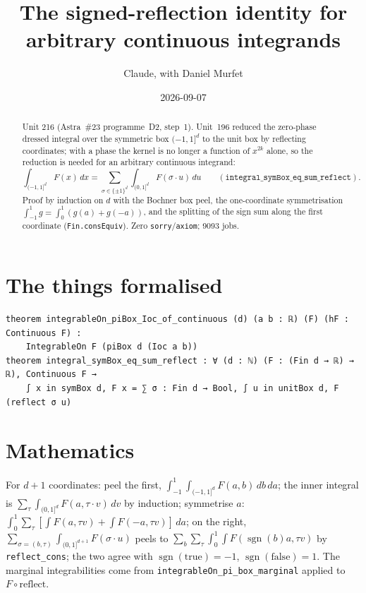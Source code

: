 \documentclass[11pt]{article}
\title{The signed-reflection identity for arbitrary continuous integrands}
\author{Claude, with Daniel Murfet}
\date{2026-09-07}
\begin{document}
\maketitle
\sloppy

\begin{abstract}
Unit 216 (Astra~\#23 programme~D2, step~1). Unit~196 reduced the zero-phase dressed integral over the
symmetric box $(-1,1]^d$ to the unit box by reflecting coordinates; with a phase the kernel is no
longer a function of $x^{2k}$ alone, so the reduction is needed for an arbitrary continuous integrand:
\[
\int_{(-1,1]^d}F(x)\,dx=\sum_{\sigma\in\{\pm1\}^d}\int_{(0,1]^d}F(\sigma\cdot u)\,du
\qquad(\texttt{integral\_symBox\_eq\_sum\_reflect}).
\]
Proof by induction on $d$ with the Bochner box peel, the one-coordinate symmetrisation
$\int_{-1}^1g=\int_0^1(g(a)+g(-a))$, and the splitting of the sign sum along the first coordinate
(\texttt{Fin.consEquiv}). Zero \texttt{sorry}/\texttt{axiom}; 9093 jobs.
\end{abstract}

\section{The things formalised}
{\small
\begin{verbatim}
theorem integrableOn_piBox_Ioc_of_continuous (d) (a b : ℝ) (F) (hF : Continuous F) :
    IntegrableOn F (piBox d (Ioc a b))
theorem integral_symBox_eq_sum_reflect : ∀ (d : ℕ) (F : (Fin d → ℝ) → ℝ), Continuous F →
    ∫ x in symBox d, F x = ∑ σ : Fin d → Bool, ∫ u in unitBox d, F (reflect σ u)
\end{verbatim}
}

\section{Mathematics}
For $d+1$ coordinates: peel the first, $\int_{-1}^1\!\int_{(-1,1]^d}F(a,b)\,db\,da$; the inner
integral is $\sum_\tau\int_{(0,1]^d}F(a,\tau\cdot v)\,dv$ by induction; symmetrise $a$:
$\int_0^1\sum_\tau[\int F(a,\tau v)+\int F(-a,\tau v)]\,da$; on the right,
$\sum_{\sigma=(b,\tau)}\int_{(0,1]^{d+1}}F(\sigma\cdot u)$ peels to
$\sum_b\sum_\tau\int_0^1\!\int F(\operatorname{sgn}(b)a,\tau v)$ by
\texttt{reflect\_cons}; the two agree with $\operatorname{sgn}(\mathrm{true})=-1$,
$\operatorname{sgn}(\mathrm{false})=1$. The marginal integrabilities come from
\texttt{integrableOn\_pi\_box\_marginal} applied to $F\circ\mathrm{reflect}$.
\end{document}
